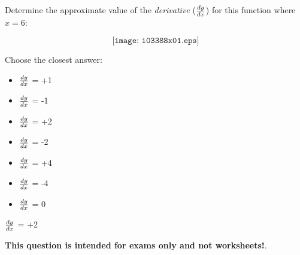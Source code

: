 

Determine the approximate value of the {\it derivative} ($dy \over dx$) for this function where $x=6$:

$$\texttt{[image: i03388x01.eps]}$$

Choose the closest answer:

\begin{itemize}
\item{} $dy \over dx$ = +1
\vskip 10pt 
\item{} $dy \over dx$ = -1
\vskip 10pt 
\item{} $dy \over dx$ = +2
\vskip 10pt 
\item{} $dy \over dx$ = -2
\vskip 10pt 
\item{} $dy \over dx$ = +4
\vskip 10pt 
\item{} $dy \over dx$ = -4
\vskip 10pt 
\item{} $dy \over dx$ = 0
\end{itemize}







$dy \over dx$ = +2







{\bf This question is intended for exams only and not worksheets!}.



